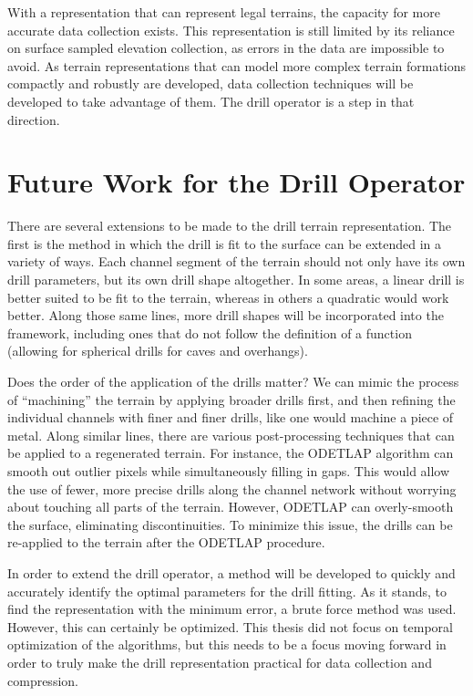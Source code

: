 With a representation that can represent legal terrains, the capacity for more accurate data collection exists. This representation is still limited by its reliance on surface sampled elevation collection, as errors in the data are impossible to avoid. As terrain representations that can model more complex terrain formations compactly and robustly are developed, data collection techniques will be developed to take advantage of them. The drill operator is a step in that direction.

\section{Future Work for the Drill Operator}

There are several extensions to be made to the drill terrain representation. The first is the method in which the drill is fit to the surface can be extended in a variety of ways. Each channel segment of the terrain should not only have its own drill parameters, but its own drill shape altogether. In some areas, a linear drill is better suited to be fit to the terrain, whereas in others a quadratic would work better. Along those same lines, more drill shapes will be incorporated into the framework, including ones that do not follow the definition of a function (allowing for spherical drills for caves and overhangs). 

Does the order of the application of the drills matter? We can mimic the process of ``machining'' the terrain by applying broader drills first, and then refining the individual channels with finer and finer drills, like one would machine a piece of metal. Along similar lines, there are various post-processing techniques that can be applied to a regenerated terrain. For instance, the ODETLAP algorithm can smooth out outlier pixels while simultaneously filling in gaps. This would allow the use of fewer, more precise drills along the channel network without worrying about touching all parts of the terrain. However, ODETLAP can overly-smooth the surface, eliminating discontinuities. To minimize this issue, the drills can be re-applied to the terrain after the ODETLAP procedure.

In order to extend the drill operator, a method will be developed to quickly and accurately identify the optimal parameters for the drill fitting. As it stands, to find the representation with the minimum error, a brute force method was used. However, this can certainly be optimized. This thesis did not focus on temporal optimization of the algorithms, but this needs to be a focus moving forward in order to truly make the drill representation practical for data collection and compression.

